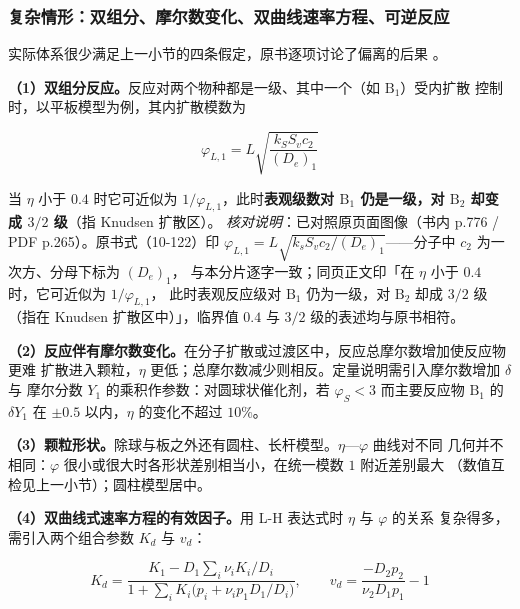 \subsubsection{复杂情形：双组分、摩尔数变化、双曲线速率方程、可逆反应}

实际体系很少满足上一小节的四条假定，原书逐项讨论了偏离的后果
。

\textbf{（1）双组分反应。}反应对两个物种都是一级、其中一个（如 $\mathrm{B_1}$）受内扩散
控制时，以平板模型为例，其内扩散模数为

\begin{equation}
\varphi_{L,1}=L\sqrt{\frac{k_SS_vc_2}{(D_e)_1}}
\label{eq:ch10-bicomp}
\end{equation}

当 $\eta$ 小于 $0.4$ 时它可近似为 $1/\varphi_{L,1}$，此时\textbf{表观级数对 $\mathrm{B_1}$
仍是一级，对 $\mathrm{B_2}$ 却变成 $3/2$ 级}（指 Knudsen 扩散区）。
\emph{核对说明}：已对照原页面图像（书内 p.776 / PDF p.265）。原书式（10-122）印
$\varphi_{L,1}=L\sqrt{k_sS_vc_2/(D_e)_1}$——分子中 $c_2$ 为一次方、分母下标为 $(D_e)_1$，
与本分片逐字一致；同页正文印「在 $\eta$ 小于 $0.4$ 时，它可近似为 $1/\varphi_{L,1}$，
此时表观反应级对 $\mathrm{B_1}$ 仍为一级，对 $\mathrm{B_2}$ 却成 $3/2$ 级（指在 Knudsen
扩散区中）」，临界值 $0.4$ 与 $3/2$ 级的表述均与原书相符。

\textbf{（2）反应伴有摩尔数变化。}在分子扩散或过渡区中，反应总摩尔数增加使反应物更难
扩散进入颗粒，$\eta$ 更低；总摩尔数减少则相反。定量说明需引入摩尔数增加 $\delta$ 与
摩尔分数 $Y_1$ 的乘积作参数：对圆球状催化剂，若 $\varphi_S<3$ 而主要反应物
$\mathrm{B_1}$ 的 $\delta Y_1$ 在 $\pm0.5$ 以内，$\eta$ 的变化不超过 $10\%$。

\textbf{（3）颗粒形状。}除球与板之外还有圆柱、长杆模型。$\eta$—$\varphi$ 曲线对不同
几何并不相同：$\varphi$ 很小或很大时各形状差别相当小，在统一模数 $1$ 附近差别最大
（数值互检见上一小节）；圆柱模型居中。

\textbf{（4）双曲线式速率方程的有效因子。}用 L-H 表达式时 $\eta$ 与 $\varphi$ 的关系
复杂得多，需引入两个组合参数 $K_d$ 与 $v_d$：

\begin{equation}
K_d=\frac{K_1-D_1\sum_i\nu_iK_i/D_i}
{1+\sum_iK_i\bigl(p_i+\nu_ip_1D_1/D_i\bigr)},\qquad
v_d=\frac{-D_2p_2}{\nu_2D_1p_1}-1
\label{eq:ch10-kd}
\end{equation}

